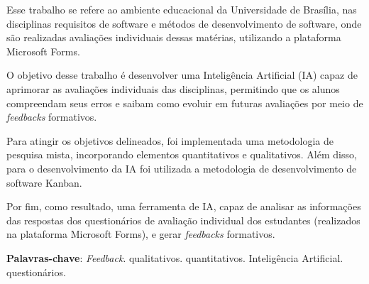 \begin{resumo}

    Esse trabalho se refere ao ambiente educacional da Universidade de Brasília, nas disciplinas requisitos de software e métodos de desenvolvimento de software, onde são realizadas avaliações individuais dessas matérias, utilizando a plataforma Microsoft Forms. 

    O objetivo desse trabalho é desenvolver uma Inteligência Artificial (IA) capaz de aprimorar as avaliações individuais das disciplinas, permitindo que os alunos compreendam seus erros e saibam como evoluir em futuras avaliações por meio de \textit{feedbacks} formativos.

    Para atingir os objetivos delineados, foi implementada uma metodologia de pesquisa mista, incorporando elementos quantitativos e qualitativos. Além disso, para o desenvolvimento da IA foi utilizada a metodologia de desenvolvimento de software Kanban.

    Por fim, como resultado, uma ferramenta de IA, capaz de analisar as informações das respostas dos questionários de avaliação individual dos estudantes (realizados na plataforma Microsoft Forms), e gerar \textit{feedbacks} formativos.

 \vspace{\onelineskip}
    
 \noindent
 \textbf{Palavras-chave}: \textit{Feedback}. qualitativos. quantitativos. Inteligência Artificial. questionários. 
\end{resumo}
